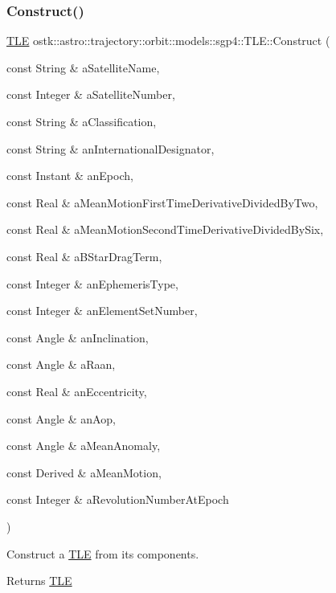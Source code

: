 \subsubsection{\texorpdfstring{Construct()}{Construct()}\hspace{0.1cm}{\footnotesize\ttfamily [1/2]}}
{\footnotesize\ttfamily \hyperlink{classostk_1_1astro_1_1trajectory_1_1orbit_1_1models_1_1sgp4_1_1_t_l_e}{T\+LE} ostk\+::astro\+::trajectory\+::orbit\+::models\+::sgp4\+::\+T\+L\+E\+::\+Construct (\begin{DoxyParamCaption}\item[{const String \&}]{a\+Satellite\+Name,  }\item[{const Integer \&}]{a\+Satellite\+Number,  }\item[{const String \&}]{a\+Classification,  }\item[{const String \&}]{an\+International\+Designator,  }\item[{const Instant \&}]{an\+Epoch,  }\item[{const Real \&}]{a\+Mean\+Motion\+First\+Time\+Derivative\+Divided\+By\+Two,  }\item[{const Real \&}]{a\+Mean\+Motion\+Second\+Time\+Derivative\+Divided\+By\+Six,  }\item[{const Real \&}]{a\+B\+Star\+Drag\+Term,  }\item[{const Integer \&}]{an\+Ephemeris\+Type,  }\item[{const Integer \&}]{an\+Element\+Set\+Number,  }\item[{const Angle \&}]{an\+Inclination,  }\item[{const Angle \&}]{a\+Raan,  }\item[{const Real \&}]{an\+Eccentricity,  }\item[{const Angle \&}]{an\+Aop,  }\item[{const Angle \&}]{a\+Mean\+Anomaly,  }\item[{const Derived \&}]{a\+Mean\+Motion,  }\item[{const Integer \&}]{a\+Revolution\+Number\+At\+Epoch }\end{DoxyParamCaption})\hspace{0.3cm}{\ttfamily [static]}}



Construct a \hyperlink{classostk_1_1astro_1_1trajectory_1_1orbit_1_1models_1_1sgp4_1_1_t_l_e}{T\+LE} from its components. 

\begin{DoxyReturn}{Returns}
\hyperlink{classostk_1_1astro_1_1trajectory_1_1orbit_1_1models_1_1sgp4_1_1_t_l_e}{T\+LE} 
\end{DoxyReturn}
\mbox{\label{classostk_1_1astro_1_1trajectory_1_1orbit_1_1models_1_1sgp4_1_1_t_l_e_ac772bf8fc68aa1cb0f8c17a2755165ed}} 
